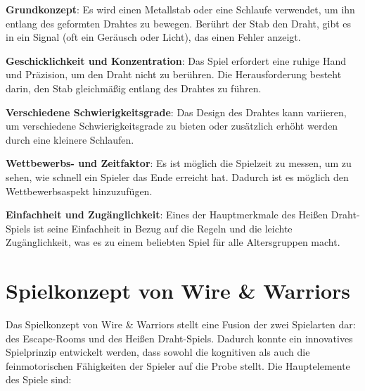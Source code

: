 \begin{compactitem}
 \item \textbf{Grundkonzept}:  Es wird einen Metallstab oder eine Schlaufe verwendet, um ihn entlang des geformten Drahtes zu bewegen. Berührt der Stab den Draht, gibt es in ein Signal (oft ein Geräusch oder Licht), das einen Fehler anzeigt.
 \item \textbf{Geschicklichkeit und Konzentration}: Das Spiel erfordert eine ruhige Hand und Präzision, um den Draht nicht zu berühren. Die Herausforderung besteht darin, den Stab gleichmäßig entlang des Drahtes zu führen.
 \item \textbf{Verschiedene Schwierigkeitsgrade}: Das Design des Drahtes kann variieren, um verschiedene Schwierigkeitsgrade zu bieten oder zusätzlich erhöht werden durch eine kleinere Schlaufen.
 \item \textbf{Wettbewerbs- und Zeitfaktor}: Es ist möglich die Spielzeit zu messen, um zu sehen, wie schnell ein Spieler das Ende erreicht hat. Dadurch ist es möglich den Wettbewerbsaspekt hinzuzufügen.
 \item \textbf{Einfachheit und Zugänglichkeit}: Eines der Hauptmerkmale des Heißen Draht-Spiels ist seine Einfachheit in Bezug auf die Regeln und die leichte Zugänglichkeit, was es zu einem beliebten Spiel für alle Altersgruppen macht.
\end{compactitem}

\section{Spielkonzept von Wire \& Warriors}

Das Spielkonzept von Wire \& Warriors stellt eine Fusion der zwei Spielarten dar: des Escape-Rooms und des Heißen Draht-Spiels. Dadurch konnte ein innovatives Spielprinzip entwickelt werden, dass sowohl die kognitiven als auch die feinmotorischen Fähigkeiten der Spieler auf die Probe stellt. Die Hauptelemente des Spiele sind:

